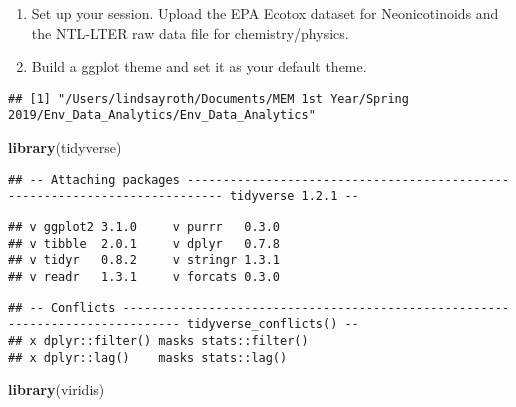 \documentclass[]{article}
\newenvironment{Shaded}{\begin{snugshade}}{\end{snugshade}}
\newcommand{\KeywordTok}[1]{\textcolor[rgb]{0.13,0.29,0.53}{\textbf{#1}}}
\newcommand{\CommentTok}[1]{\textcolor[rgb]{0.56,0.35,0.01}{\textit{#1}}}
\newcommand{\NormalTok}[1]{#1}
\begin{document}
\begin{enumerate}
\def\labelenumi{\arabic{enumi}.}
\item
  Set up your session. Upload the EPA Ecotox dataset for Neonicotinoids
  and the NTL-LTER raw data file for chemistry/physics.
\item
  Build a ggplot theme and set it as your default theme.
\end{enumerate}

\begin{Shaded}
\end{Shaded}

\begin{verbatim}
## [1] "/Users/lindsayroth/Documents/MEM 1st Year/Spring 2019/Env_Data_Analytics/Env_Data_Analytics"
\end{verbatim}

\begin{Shaded}
\begin{Highlighting}[]
\KeywordTok{library}\NormalTok{(tidyverse)}
\end{Highlighting}
\end{Shaded}

\begin{verbatim}
## -- Attaching packages --------------------------------------------------------------------------- tidyverse 1.2.1 --
\end{verbatim}

\begin{verbatim}
## v ggplot2 3.1.0     v purrr   0.3.0
## v tibble  2.0.1     v dplyr   0.7.8
## v tidyr   0.8.2     v stringr 1.3.1
## v readr   1.3.1     v forcats 0.3.0
\end{verbatim}

\begin{verbatim}
## -- Conflicts ------------------------------------------------------------------------------ tidyverse_conflicts() --
## x dplyr::filter() masks stats::filter()
## x dplyr::lag()    masks stats::lag()
\end{verbatim}

\begin{Shaded}
\begin{Highlighting}[]
\KeywordTok{library}\NormalTok{(viridis)}
\end{Highlighting}
\end{Shaded}
\end{document}
